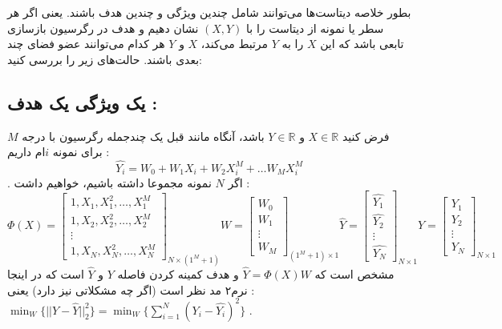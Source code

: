 \documentclass[a4paper, 12pt]{article}
\begin{document}
بطور خلاصه دیتاست‌ها می‌توانند شامل چندین ویژگی و چندین هدف باشند. یعنی اگر هر سطر یا نمونه از دیتاست را با 
$(X,Y)$
نشان دهیم و هدف در رگرسیون بازسازی تابعی باشد که این 
$X$
را به 
$Y$
مرتبط می‌کند، $X$ و $Y$ هر کدام می‌توانند عضو فضای چند بعدی باشند. حالت‌های زیر را بررسی کنید:
\subsection*{یک ویژگی یک هدف : }
فرض کنید 
$X \in \mathbb{R}$
و
$Y \in \mathbb{R}$
باشد، آنگاه مانند قبل یک چندجمله رگرسیون با درجه 
$M$
 برای نمونه $i$ام داریم :
\[
\hat{Y_i} = W_0 + W_1 X_i  + W_2X_i^M + \dots W_MX_i^M
\]
.
اگر 
$N$
نمونه مجموعا داشته باشیم، خواهیم داشت :
\[
\Phi(X) = \begin{bmatrix}
	1,X_1,X_1^2,\dots,X_1^M\\
	1,X_2,X_2^2,\dots,X_2^M \\
	\vdots\\
	1,X_N,X_N^2,\dots,X_N^M
\end{bmatrix}_{N\times (1^M+1)}
W = \begin{bmatrix}
	W_0\\W_1\\\vdots\\W_M
\end{bmatrix}_{(1^M + 1) \times 1}
\hat{Y} = \begin{bmatrix}
	\hat{Y_1}\\\hat{Y_2}\\\vdots\\\hat{Y_N}
\end{bmatrix}_{N\times 1}
Y = \begin{bmatrix}
	Y_1\\Y_2\\\vdots\\Y_N
\end{bmatrix}_{N\times 1}
\]
مشخص است که 
$\hat{Y} = \Phi(X)W$
و هدف کمینه کردن فاصله 
$Y$
و
$\hat{Y}$
است که در اینجا نرم۲ مد نظر است (اگر چه مشکلاتی نیز دارد) یعنی :
$\min_W\{||Y-\hat{Y}||_2^2\} = \min_W \{\sum\limits_{i=1}^{N}(Y_i - \hat{Y_i})^2\}$
.
\end{document}
